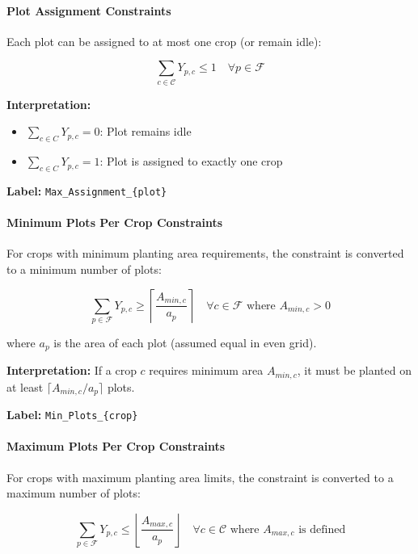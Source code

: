 \documentclass{article}
\begin{document}
\paragraph{Plot Assignment Constraints}

Each plot can be assigned to at most one crop (or remain idle):

$$\sum_{c \in \mathcal{C}} Y_{p,c} \leq 1 \quad \forall p \in \mathcal{F}$$



\textbf{Interpretation:}
\begin{itemize}
    \item $\sum_{c \in C} Y_{p,c} = 0$: Plot remains idle
    \item $\sum_{c \in C} Y_{p,c} = 1$: Plot is assigned to exactly one crop
\end{itemize}

\textbf{Label:} \texttt{Max\_Assignment\_\{plot\}}

\paragraph{Minimum Plots Per Crop Constraints}

For crops with minimum planting area requirements, the constraint is converted to a minimum number of plots:

$$\sum_{p \in \mathcal{F}} Y_{p,c} \geq \left\lceil \frac{A_{min,c}}{a_p} \right\rceil \quad \forall c \in \mathcal{F} \text{ where } A_{min,c} > 0$$

where $a_p$ is the area of each plot (assumed equal in even grid).



\textbf{Interpretation:} If a crop $c$ requires minimum area $A_{min,c}$, it must be planted on at least $\lceil A_{min,c} / a_p \rceil$ plots.

\textbf{Label:} \texttt{Min\_Plots\_\{crop\}}

\paragraph{Maximum Plots Per Crop Constraints}

For crops with maximum planting area limits, the constraint is converted to a maximum number of plots:

$$\sum_{p \in \mathcal{F}} Y_{p,c} \leq \left\lfloor \frac{A_{max,c}}{a_p} \right\rfloor \quad \forall c \in \mathcal{C} \text{ where } A_{max,c} \text{ is defined}$$
\end{document}
